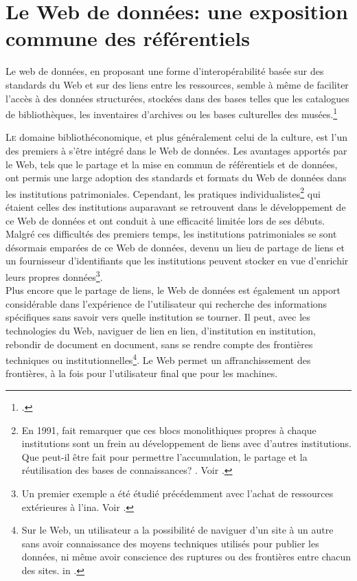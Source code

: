 \chapter{\label{II-A}Le Web de données: une exposition commune des référentiels}

\begin{citationLongue}
	Le web de données, en proposant une forme d'interopérabilité basée sur des standards du Web et sur des liens entre les ressources, semble à même de faciliter l'accès à des données structurées, stockées dans des bases telles que les catalogues de bibliothèques, les inventaires d'archives ou les bases culturelles des musées.\footcite[p.45]{dalbin_approches_2011}
\end{citationLongue}
\medskip
\lettrine{L}e domaine bibliothéconomique, et plus généralement celui de la culture, est l'un des premiers à s'être intégré dans le Web de données. Les avantages apportés par le Web, tels que le partage et la mise en commun de référentiels et de données, ont permis une large adoption des standards et formats du Web de données dans les institutions patrimoniales. Cependant, les pratiques individualistes\footnote{En 1991,  fait remarquer que ces \og blocs monolithiques\fg{} propres à chaque institutions sont un frein au développement de liens avec d'autres institutions. \og Que peut-il être fait pour permettre l'accumulation, le partage et la réutilisation des bases de connaissances? \fg{}. Voir \cite[p.1]{gruber_role_1991}.} qui étaient celles des institutions auparavant se retrouvent dans le développement de ce Web de données et ont conduit à une efficacité limitée lors de ses débuts.\\

Malgré ces difficultés des premiers temps, les institutions patrimoniales se sont désormais emparées de ce Web de données, devenu un lieu de partage de liens et un fournisseur d'identifiants que les institutions peuvent stocker en vue d'enrichir leurs propres données\footnote{Un premier exemple a été étudié précédemment avec l'achat de ressources extérieures à l'\ac{ina}. Voir .}.\\

Plus encore que le partage de liens, le Web de données est également un apport considérable dans l'expérience de l'utilisateur qui recherche des informations spécifiques sans savoir vers quelle institution se tourner. Il peut, avec les technologies du Web, naviguer de lien en lien, d'institution en institution, rebondir de document en document, sans se rendre compte des frontières techniques ou institutionnelles\footnote{\og Sur le Web, un utilisateur a la possibilité de naviguer d'un site à un autre sans avoir connaissance des moyens techniques utilisés pour publier les données, ni même avoir conscience des ruptures ou des frontières entre chacun des sites. \fg{} in \cite[p.45]{dalbin_approches_2011}.}. Le Web permet un affranchissement des frontières, à la fois pour l'utilisateur final que pour les machines.\\

